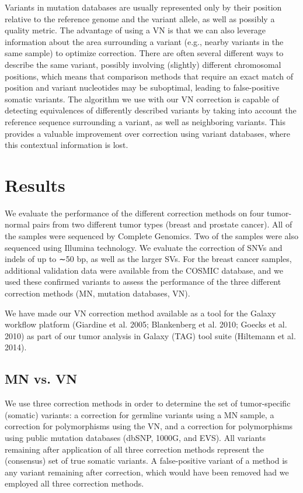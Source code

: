 Variants in mutation databases are usually represented only by their position relative to the reference genome and the variant allele, as well as possibly a quality metric. The advantage of using a VN is that we can also leverage information about the area surrounding a variant (e.g., nearby variants in the same sample) to optimize correction. There are often several different ways to describe the same variant, possibly involving (slightly) different chromosomal positions, which means that comparison methods that require an exact match of position and variant nucleotides may be suboptimal, leading to false-positive somatic variants. The algorithm we use with our VN correction is capable of detecting equivalences of differently described variants by taking into account the reference sequence surrounding a variant, as well as neighboring variants. This provides a valuable improvement over correction using variant databases, where this contextual information is lost.

\section*{Results}

We evaluate the performance of the different correction methods on four tumor-normal pairs from two different tumor types (breast and prostate cancer). All of the samples were sequenced by Complete Genomics. Two of the samples were also sequenced using Illumina technology. We evaluate the correction of SNVs and indels of up to ∼50 bp, as well as the larger SVs. For the breast cancer samples, additional validation data were available from the COSMIC database, and we used these confirmed variants to assess the performance of the three different correction methods (MN, mutation databases, VN).

We have made our VN correction method available as a tool for the Galaxy workflow platform (Giardine et al. 2005; Blankenberg et al. 2010; Goecks et al. 2010) as part of our tumor analysis in Galaxy (TAG) tool suite (Hiltemann et al. 2014).

\subsection*{MN vs. VN}

We use three correction methods in order to determine the set of tumor-specific (somatic) variants: a correction for germline variants using a MN sample, a correction for polymorphisms using the VN, and a correction for polymorphisms using public mutation databases (dbSNP, 1000G, and EVS). All variants remaining after application of all three correction methods represent the (consensus) set of true somatic variants. A false-positive variant of a method is any variant remaining after correction, which would have been removed had we employed all three correction methods.

